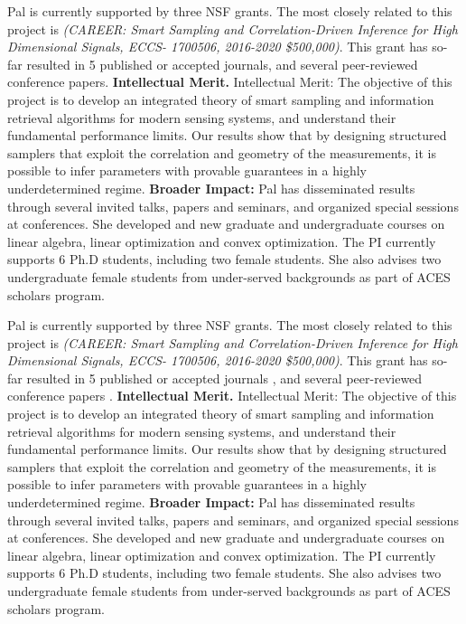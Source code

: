  Pal is currently supported by three NSF grants. The most closely related to this project is {\em  (CAREER: Smart Sampling and Correlation-Driven Inference for High Dimensional Signals, ECCS- 1700506, 2016-2020 \$500,000)}. This grant has so-far resulted in 5 published or accepted journals, and several peer-reviewed conference papers. {\bf Intellectual Merit.} Intellectual Merit: The objective of this project is to develop an integrated theory of smart sampling and information retrieval algorithms for modern sensing systems, and understand their fundamental performance limits. Our results show that by designing structured samplers that exploit the correlation and geometry of the measurements, it is possible to infer parameters with provable guarantees in a highly underdetermined regime. {\bf Broader Impact:} Pal has disseminated results through several invited talks, papers and seminars, and organized special sessions at conferences. She developed and new graduate and undergraduate courses on linear algebra, linear optimization and convex optimization. The PI currently supports 6 Ph.D students, including two female students. She also advises two undergraduate female students from under-served backgrounds as part of ACES scholars program. 

 Pal is currently supported by three NSF grants. The most closely related to this project is {\em  (CAREER: Smart Sampling and Correlation-Driven Inference for High Dimensional Signals, ECCS- 1700506, 2016-2020 \$500,000)}. This grant has so-far resulted in 5 published or accepted journals \cite{}, and several peer-reviewed conference papers \cite{}. {\bf Intellectual Merit.} Intellectual Merit: The objective of this project is to develop an integrated theory of smart sampling and information retrieval algorithms for modern sensing systems, and understand their fundamental performance limits. Our results show that by designing structured samplers that exploit the correlation and geometry of the measurements, it is possible to infer parameters with provable guarantees in a highly underdetermined regime. {\bf Broader Impact:} Pal has disseminated results through several invited talks, papers and seminars, and organized special sessions at conferences. She developed and new graduate and undergraduate courses on linear algebra, linear optimization and convex optimization. The PI currently supports 6 Ph.D students, including two female students. She also advises two undergraduate female students from under-served backgrounds as part of ACES scholars program. 



